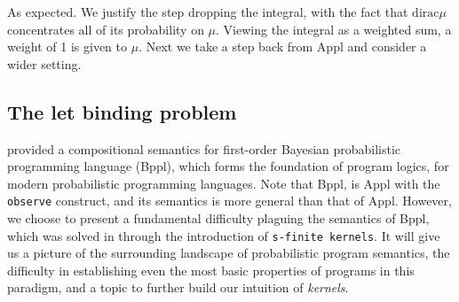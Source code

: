 As expected. We justify the step dropping the integral, with the fact that $\mathrm{dirac} \mu$ concentrates all of its probability on $\mu$. Viewing the integral as a weighted sum, a weight of 1 is given
to $\mu$. Next we take a step back from Appl and consider a wider setting.

\subsection{The let binding problem}

\citet{prob-semantics} provided a compositional semantics for first-order Bayesian probabilistic programming language (Bppl), which forms the foundation of program logics, for modern probabilistic
programming languages. Note that Bppl, is Appl with the \texttt{observe} construct, and its semantics is more general than that of Appl. However, we choose to present a fundamental difficulty
plaguing the semantics of Bppl, which was solved in \citep{prob-semantics} through the introduction of \texttt{s-finite kernels}. It will give us a picture of the surrounding landscape of probabilistic
program semantics, the difficulty in establishing even the most basic properties of programs in this paradigm, and a topic to further build our intuition of \emph{kernels}.

